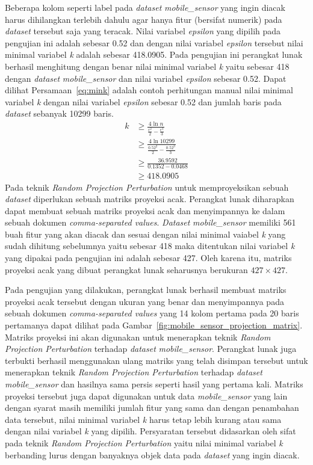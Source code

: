 Beberapa kolom seperti label pada \textit{dataset} \textit{mobile\_sensor} yang ingin diacak harus dihilangkan terlebih dahulu agar hanya fitur (bersifat numerik) pada \textit{dataset} tersebut saja yang teracak. Nilai variabel \textit{epsilon} yang dipilih pada pengujian ini adalah sebesar 0.52 dan dengan nilai variabel \textit{epsilon} tersebut nilai minimal variabel \textit{k} adalah sebesar 418.0905. Pada pengujian ini perangkat lunak berhasil menghitung dengan benar nilai minimal variabel \textit{k} yaitu sebesar 418 dengan \textit{dataset} \textit{mobile\_sensor} dan nilai variabel \textit{epsilon} sebesar 0.52. Dapat dilihat Persamaan~\ref{eq:mink} adalah contoh perhitungan manual nilai minimal variabel \textit{k} dengan nilai variabel \textit{epsilon} sebesar 0.52 dan jumlah baris pada \textit{dataset} sebanyak 10299 baris.
\begin{align}
	k &\geq \frac{4\ln{n}}{\frac{\epsilon^{2}}{2}-\frac{\epsilon^{3}}{3}} \label{eq:mink}\\
	&\geq \frac{4\ln{10299}}{\frac{0.52^{2}}{2}-\frac{0.52^{3}}{3}} \nonumber\\
	&\geq \frac{36.9592}{0.1352-0.0468} \nonumber\\
	&\geq 418.0905 \nonumber
\end{align}
Pada teknik \textit{Random Projection Perturbation} untuk memproyeksikan sebuah \textit{dataset} diperlukan sebuah matriks proyeksi acak. Perangkat lunak diharapkan dapat membuat sebuah matriks proyeksi acak dan menyimpannya ke dalam sebuah dokumen \textit{comma-separated values}. \textit{Dataset} \textit{mobile\_sensor} memiliki 561 buah fitur yang akan diacak dan sesuai dengan nilai minimal vaiabel \textit{k} yang sudah dihitung sebelumnya yaitu sebesar 418 maka ditentukan nilai variabel \textit{k} yang dipakai pada pengujian ini adalah sebesar 427. Oleh karena itu, matriks proyeksi acak yang dibuat perangkat lunak seharusnya berukuran \(427\times427\).

Pada pengujian yang dilakukan, perangkat lunak berhasil membuat matriks proyeksi acak tersebut dengan ukuran yang benar dan menyimpannya pada sebuah dokumen \textit{comma-separated values} yang 14 kolom pertama pada 20 baris pertamanya dapat dilihat pada Gambar~\ref{fig:mobile_sensor_projection_matrix}. Matriks proyeksi ini akan digunakan untuk menerapkan teknik \textit{Random Projection Perturbation} terhadap \textit{dataset} \textit{mobile\_sensor}. Perangkat lunak juga terbukti berhasil menggunakan ulang matriks yang telah disimpan tersebut untuk menerapkan teknik \textit{Random Projection Perturbation} terhadap \textit{dataset} \textit{mobile\_sensor} dan hasilnya sama persis seperti hasil yang pertama kali. Matriks proyeksi tersebut juga dapat digunakan untuk data \textit{mobile\_sensor} yang lain dengan syarat masih memiliki jumlah fitur yang sama dan dengan penambahan data tersebut, nilai minimal variabel \textit{k} harus tetap lebih kurang atau sama dengan nilai variabel \textit{k} yang dipilih. Persyaratan tersebut didasarkan oleh sifat pada teknik \textit{Random Projection Perturbation} yaitu nilai minimal variabel \textit{k} berbanding lurus dengan banyaknya objek data pada \textit{dataset} yang ingin diacak.

